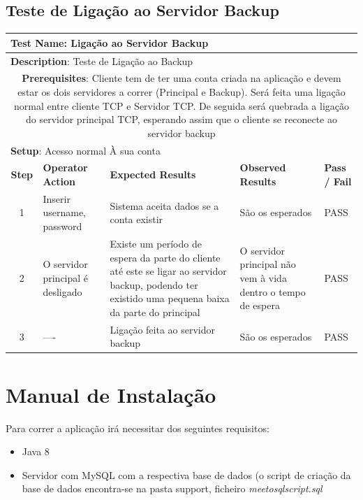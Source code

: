 \documentclass[12pt]{article} %
\begin{document}
\subsection{Teste de Ligação ao Servidor Backup}
\begin{table}[ht!]
	\begin{tabular}{|c|p{4cm}|p{4cm}|p{3cm}|p{1cm}|}
		\hline
		\multicolumn{5}{|l|}{\textbf{Test Name}: Ligação ao Servidor Backup}\\
		\hline
		\multicolumn{5}{|l|}{\textbf{Description}: Teste de Ligação ao Backup}\\
		\hline
		\multicolumn{5}{|p{14,5cm}|}{\textbf{Prerequisites}: Cliente tem de ter uma conta criada na aplicação e devem estar os dois servidores a correr (Principal e Backup). Será feita uma ligação normal entre cliente TCP e Servidor TCP. De seguida será quebrada a ligação do servidor principal TCP, esperando assim que o cliente se reconecte ao servidor backup}\\
		\hline
		\multicolumn{5}{|l|}{\textbf{Setup}: Acesso normal À sua conta}\\
		\hline
		\textbf{Step} & \textbf{Operator Action} & \textbf{Expected Results} & \textbf{Observed Results} & \textbf{Pass / Fail}\\
		\hline
		1 & Inserir username, password & Sistema aceita dados se a conta existir & São os esperados & PASS\\
		\hline
		2 & O servidor principal é desligado & Existe um período de espera da parte do cliente até este se ligar ao servidor backup, podendo ter existido uma pequena baixa da parte do principal & O servidor principal não vem à vida dentro o tempo de espera & PASS\\
		\hline
		3 & ---- & Ligação feita ao servidor backup & São os esperados & PASS\\
		\hline
	\end{tabular}
\end{table}




\newpage
\section{Manual de Instalação}
\label{sec:install}
Para correr a aplicação irá necessitar dos seguintes requisitos:
\begin{itemize}
	\item Java 8
	\item Servidor com MySQL com a respectiva base de dados (o script de criação da base de dados encontra-se na pasta support, ficheiro \emph{meetosqlscript.sql}
\end{itemize}
\end{document}
